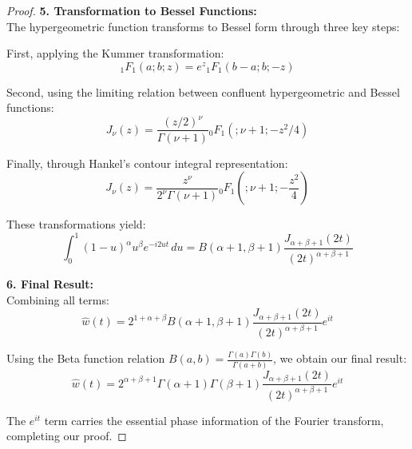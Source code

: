 \documentclass{article}
\begin{document}
\begin{proof}
\textbf{5. Transformation to Bessel Functions:}\\
The hypergeometric function transforms to Bessel form through three key steps:

First, applying the Kummer transformation:
\[ {}_1F_1(a;b;z) = e^z {}_1F_1(b-a;b;-z) \]

Second, using the limiting relation between confluent hypergeometric and Bessel functions:
\[ J_\nu(z) = \frac{(z/2)^\nu}{\Gamma(\nu+1)} {}_0F_1(;\nu+1;-z^2/4) \]

Finally, through Hankel's contour integral representation:
\[ J_\nu(z) = \frac{z^\nu}{2^\nu \Gamma(\nu+1)} {}_0F_1\left(;\nu+1;-\frac{z^2}{4}\right) \]

These transformations yield:
\[ \int_0^1 (1-u)^\alpha u^\beta e^{-i2ut} \, du = B(\alpha+1, \beta+1) \frac{J_{\alpha+\beta+1}(2t)}{(2t)^{\alpha+\beta+1}} \]

\textbf{6. Final Result:}\\
Combining all terms:
\[ \hat{w}(t) = 2^{1+\alpha+\beta} B(\alpha+1, \beta+1) \frac{J_{\alpha+\beta+1}(2t)}{(2t)^{\alpha+\beta+1}} e^{it} \]

Using the Beta function relation $B(a,b) = \frac{\Gamma(a)\Gamma(b)}{\Gamma(a+b)}$, we obtain our final result:
\[ \hat{w}(t) = 2^{\alpha+\beta+1} \Gamma(\alpha+1) \Gamma(\beta+1) \frac{J_{\alpha+\beta+1}(2t)}{(2t)^{\alpha+\beta+1}} e^{it} \]

The $e^{it}$ term carries the essential phase information of the Fourier transform, completing our proof.
\end{proof}
\end{document}

